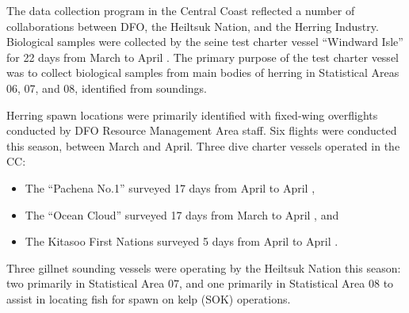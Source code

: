 The data collection program in the Central Coast reflected a number of collaborations between DFO, the Heiltsuk Nation, and the Herring Industry.
Biological samples were collected by the seine test charter vessel ``Windward Isle'' for 22 days from March 
to April .
The primary purpose of the test charter vessel was to collect biological samples from main bodies of herring in Statistical Areas 06, 07, and 08, identified from soundings.

Herring spawn locations were primarily identified with fixed-wing overflights conducted by DFO Resource Management Area staff.
Six flights were conducted this season, between March and April.
Three dive charter vessels operated in the CC:
\begin{itemize}
\item The ``Pachena No.1'' surveyed 17 days from April  to April ,
\item The ``Ocean Cloud'' surveyed 17 days from March  to April , and
\item The Kitasoo First Nations surveyed 5 days from April  to April .
\end{itemize}
Three gillnet sounding vessels were operating by the Heiltsuk Nation this season:
two primarily in Statistical Area 07, and one primarily in Statistical Area 08 to assist in locating fish for spawn on kelp (SOK) operations.